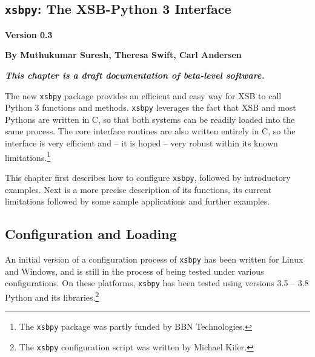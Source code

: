 \newcommand{\xsbpyversion}{Version 0.3}

\begin{center}
\chapter[XSB and Python]{{\tt xsbpy}: The XSB-Python 3 Interface} \label{chap:xsbpy}
\end{center}

\vspace*{-.30in} 
\begin{center}
{\Large {\bf  \xsbpyversion}}
\end{center}

\begin{center}
  {\Large {\bf By Muthukumar Suresh, Theresa Swift, Carl Andersen}}
\end{center}

\noindent
{\large {\bf {\em This chapter is a draft documentation of beta-level
      software.}}}

%

The new {\tt xsbpy} package provides an efficient and easy way for XSB
to call Python 3 functions and methods.  {\tt xsbpy} leverages the
fact that XSB and most Pythons are written in C, so that both systems
can be readily loaded into the same process. The core interface
routines are also written entirely in C, so the interface is very
efficient and -- it is hoped -- very robust within its known
limitations.\footnote{The {\tt xsbpy} package was partly funded by BBN
  Technologies.}

This chapter first describes how to configure {\tt xsbpy}, followed by
introductory examples.  Next is a more precise description of its
functions, its current limitations followed by some sample
applications and further examples.

\section{Configuration and Loading}

An initial version of a configuration process of {\tt xsbpy} has been
written for Linux and Windows, and is still in the process of being
tested under various configurations.  On these platforms, {\tt xsbpy}
has been tested using versions 3.5 -- 3.8 Python and its
libraries.\footnote{The {\tt xsbpy} configuration script was written
  by Michael Kifer.}


